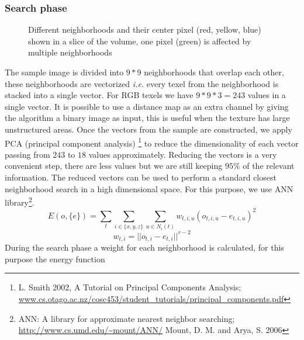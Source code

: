\documentclass[10pt, conference]{IEEEtran}
\begin{document}
{\subsubsection{Search phase}
\label{sec:SearchPhase}
%


\begin{figure}[!h]
  \vspace{-0.2cm}
  \centering
   {}
  \caption{Different neighborhoods and their center pixel (red, yellow, blue) shown in a slice of the volume, one pixel (green) is affected by multiple neighborhoods}
  \label{fig:search_phase}
  \vspace{-0.1cm}
 \end{figure}
%
The sample image is divided into $9*9$ neighborhoods that overlap each other, these neighborhoods are vectorized \emph{i.e.} 
every texel from the neighborhood is stacked into a single vector. For RGB texels we have $9 * 9 * 3 = 243$ 
values in a single vector. It is possible to 
use a distance map as an extra channel by giving the algorithm a binary image as input, 
this is useful when the texture has large unstructured areas.
Once the vectors from the sample are constructed, we apply PCA 
(principal component analysis) \footnote{L. Smith 2002, A Tutorial on Principal Components Analysis; \url{www.cs.otago.ac.nz/cosc453/student_tutorials/principal_components.pdf}}
to reduce the dimensionality of each vector passing from $243$ to $18$ values approximately.
%
Reducing the vectors is a very convenient step, there are less values but we are still keeping $95\%$ of the relevant information.
The reduced vectors can be used to perform a standard closest neighborhood search in a high dimensional space. 
For this purpose, we use ANN library\footnote{ANN: A library for approximate nearest neighbor searching; \url{http://www.cs.umd.edu/~mount/ANN/} Mount, D. M. and Arya, S. 2006}.
%
\begin{equation}
 E(o, \{e\} ) = \sum_{t} \sum_{i \in \{x, y, z\}} \sum_{u \in N_i(t)} w_{t, i, u} ( o_{t, i, u} - e_{t, i, u} )^2
 \label{equ:imagenergy} 
\end{equation}
\begin{equation}
 w_{t,i} = || o_{t, i} - e_{t, i} ||^{r - 2}
 \label{equ:neighweight}
\end{equation}
%
During the search phase a weight for each neighborhood is calculated, for this purpose the energy function 
}
\end{document}
